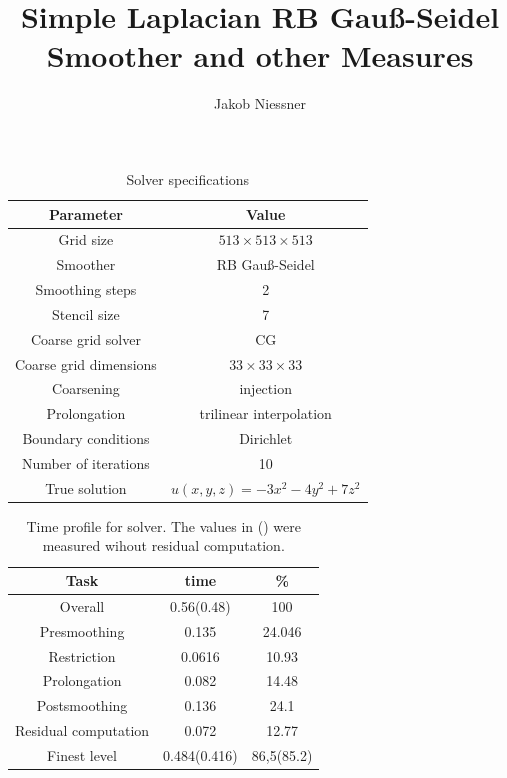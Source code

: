 \documentclass[12pt, a4paper]{article}
\title{Simple Laplacian RB Gau{\ss}-Seidel Smoother and other Measures}
\author{Jakob Niessner}
\begin{document}
\maketitle


\begin{table}[h!]
  \begin{center}
    \begin{tabular}{|c|c|}
      \hline
      \textbf{Parameter} & \textbf{Value} \\
      \hline
      Grid size & $513 \times 513 \times 513$ \\
      Smoother & RB Gau{\ss}-Seidel \\
      Smoothing steps & 2 \\
      Stencil size & 7 \\
      Coarse grid solver & CG \\
      Coarse grid dimensions & $33 \times 33 \times 33$ \\
      Coarsening & injection \\ 
      Prolongation & trilinear interpolation \\
      Boundary conditions & Dirichlet \\ 
      Number of iterations & 10 \\
      True solution & $u(x, y, z) = -3x^2 -4y^2 +7z^2$ \\
      \hline
    \end{tabular}
  \end{center}
  \caption{Solver specifications}
\end{table}

\begin{table}[h!]
\begin{center}
\begin{tabular}{|c|c|c|}
  \hline
  Task & time & \% \\
  \hline
  Overall & 0.56(0.48) & 100        \\
  Presmoothing & 0.135 & 24.046 \\
  Restriction & 0.0616 & 10.93  \\
  Prolongation & 0.082 & 14.48 \\
  Postsmoothing & 0.136 & 24.1 \\
  Residual computation & 0.072 & 12.77  \\
  Finest level &    0.484(0.416)   & 86,5(85.2) \\ 
  \hline
\end{tabular}
\end{center}
\caption{Time profile for solver. The values in () were measured wihout residual computation. }
\end{table}
\end{document}
